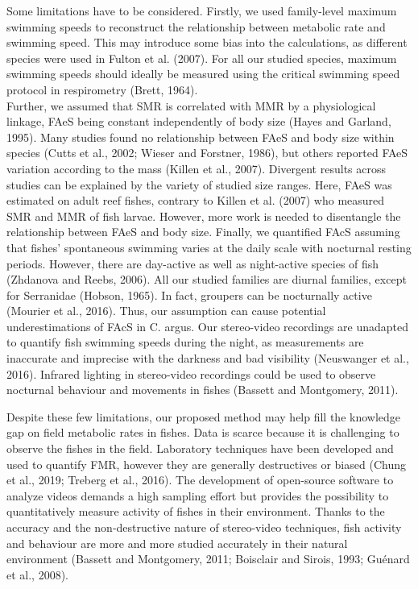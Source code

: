 \documentclass[12pt,a4paper]{article}
\begin{document}
\noindent Some limitations have to be considered. Firstly, we used
family-level maximum swimming speeds to reconstruct the relationship
between metabolic rate and swimming speed. This may introduce some bias
into the calculations, as different species were used in Fulton et al.
(2007). For all our studied species, maximum swimming speeds should
ideally be measured using the critical swimming speed protocol in
respirometry (Brett, 1964).\\
Further, we assumed that SMR is correlated with MMR by a physiological
linkage, FAeS being constant independently of body size (Hayes and
Garland, 1995). Many studies found no relationship between FAeS and body
size within species (Cutts et al., 2002; Wieser and Forstner, 1986), but
others reported FAeS variation according to the mass (Killen et al.,
2007). Divergent results across studies can be explained by the variety
of studied size ranges. Here, FAeS was estimated on adult reef fishes,
contrary to Killen et al. (2007) who measured SMR and MMR of fish
larvae. However, more work is needed to disentangle the relationship
between FAeS and body size. Finally, we quantified FAcS assuming that
fishes' spontaneous swimming varies at the daily scale with nocturnal
resting periods. However, there are day-active as well as night-active
species of fish (Zhdanova and Reebs, 2006). All our studied families are
diurnal families, except for Serranidae (Hobson, 1965). In fact,
groupers can be nocturnally active (Mourier et al., 2016). Thus, our
assumption can cause potential underestimations of FAcS in C. argus. Our
stereo-video recordings are unadapted to quantify fish swimming speeds
during the night, as measurements are inaccurate and imprecise with the
darkness and bad visibility (Neuswanger et al., 2016). Infrared lighting
in stereo-video recordings could be used to observe nocturnal behaviour
and movements in fishes (Bassett and Montgomery, 2011).

\noindent Despite these few limitations, our proposed method may help
fill the knowledge gap on field metabolic rates in fishes. Data is
scarce because it is challenging to observe the fishes in the field.
Laboratory techniques have been developed and used to quantify FMR,
however they are generally destructives or biased (Chung et al., 2019;
Treberg et al., 2016). The development of open-source software to
analyze videos demands a high sampling effort but provides the
possibility to quantitatively measure activity of fishes in their
environment. Thanks to the accuracy and the non-destructive nature of
stereo-video techniques, fish activity and behaviour are more and more
studied accurately in their natural environment (Bassett and Montgomery,
2011; Boisclair and Sirois, 1993; Guénard et al., 2008).
\end{document}
